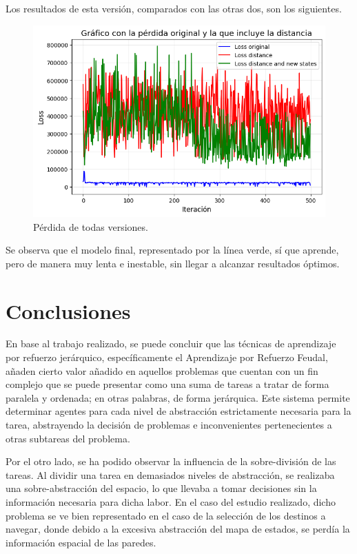 \documentclass[letterpaper]{article} %
\begin{document}
Los resultados de esta versión, comparados con las otras dos, son los siguientes.
\begin{figure}[H]
    \centering
    \includegraphics[width=0.9\columnwidth]{FuN_3.png}
    \caption{Pérdida de todas versiones.\label{fig:FuN5}}
\end{figure}

Se observa que el modelo final, representado por la línea verde, sí que aprende, pero de manera muy lenta e inestable, sin llegar a alcanzar resultados óptimos. 

\section{Conclusiones}
En base al trabajo realizado, se puede concluir que las técnicas de aprendizaje por refuerzo jerárquico, específicamente el Aprendizaje por Refuerzo Feudal, 
añaden cierto valor añadido en aquellos problemas que cuentan con un fin complejo que se puede presentar como una suma de tareas a tratar de forma paralela 
y ordenada; en otras palabras, de forma jerárquica. Este sistema permite determinar agentes para cada nivel de abstracción estrictamente necesaria para la 
tarea, abstrayendo la decisión de problemas e inconvenientes pertenecientes a otras subtareas del problema.

Por el otro lado, se ha podido observar la influencia de la sobre-división de las tareas. Al dividir una tarea en demasiados niveles de abstracción, se realizaba
una sobre-abstracción del espacio, lo que llevaba a tomar decisiones sin la información necesaria para dicha labor. En el caso del estudio realizado, dicho problema
se ve bien representado en el caso de la selección de los destinos a navegar, donde debido a la excesiva abstracción del mapa de estados, se perdía la información
espacial de las paredes. 
\end{document}
